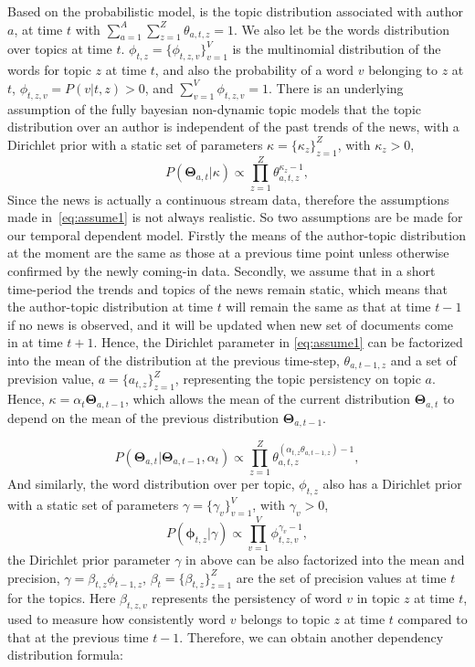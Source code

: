 Based on the probabilistic model, \thetadef is the topic distribution associated with author $a$, at time $t$ with  $\sum_{a=1}^A\sum_{z=1}^Z\theta_{a, t, z}=1$. We also let \phidef be the words distribution over topics at time $t$. $\phi_{t, z}=\{\phi_{t, z, v}\}_{v=1}^V$ is the multinomial distribution of the words for topic $z$ at time $t$, and also the probability of a word $v$ belonging to $z$ at $t$, $\phi_{t, z, v}=P(v|t, z)>0$, and $\sum_{v=1}^V \phi_{t, z, v}=1$. There is an underlying assumption of the fully bayesian non-dynamic topic models that the topic distribution over an author is independent of the past trends of the news, with a Dirichlet prior with a static set of parameters $\kappa=\{\kappa_z\}_{z=1}^Z$, with $\kappa_{z}>0$,
\begin{equation}
\label{eq:assume1}
P(\boldsymbol{\Theta}_{a,t} | \kappa)  \propto \prod_{z=1}^Z \theta_{a, t, z}^{\kappa_z -1},
\end{equation}
Since the news is actually a continuous stream data, therefore the assumptions made in~\eqref{eq:assume1} is not always realistic. So two assumptions are be made for our temporal dependent model. Firstly the means of the author-topic distribution at the moment are the same as those at a previous time point unless otherwise confirmed by the newly coming-in data. Secondly, we assume that in a short time-period the trends and topics of the news remain static, which means that the author-topic distribution at time $t$ will remain the same as that at time $t-1$ if no news is observed, and it will be updated when new set of documents come in at time $t+1$. Hence, the Dirichlet parameter in \eqref{eq:assume1} can be factorized into the mean of the distribution at the previous time-step, $\theta_{a,t-1,z}$ and a set of prevision value, $a = \{a_{t,z}\}_{z=1}^Z$, representing the topic persistency on topic $a$. Hence, $\kappa=\alpha_t \boldsymbol{\Theta}_{a,t-1}$, which allows the mean of the current distribution $\boldsymbol{\Theta}_{a,t}$ to depend on the mean of the previous distribution $\boldsymbol{\Theta}_{a,t-1}$.

\begin{equation}
\label{eq:shortTheta}
P(\boldsymbol{\Theta}_{a,t} | \boldsymbol{\Theta}_{a,t-1}, \alpha_t) \propto \prod_{z=1}^Z \theta_{a,t, z}^{(\alpha_{t, z} \theta_{a,t-1, z}) -1},
\end{equation}
And similarly, the word distribution over per topic, $\phi_{t, z}$ also has a Dirichlet prior with a static set of parameters $\gamma=\{\gamma_v\}_{v=1}^V$, with $\gamma_v>0$, 
\begin{equation}
\label{eq:assume2}
P(\boldsymbol{\phi}_{t, z} | \gamma) \propto \prod_{v=1}^V \phi_{t, z, v}^{\gamma_v -1},
\end{equation}
the Dirichlet prior parameter $\gamma$ in above can be also factorized into the mean and precision, $\gamma=\beta_{t, z} \phi_{t-1, z}$,  $\beta_t=\{\beta_{t, z}\}_{z=1}^Z$ are the set of precision values at time $t$ for the topics. Here $\beta_{t, z, v}$ represents the persistency of word $v$ in topic $z$ at time $t$, used to measure how consistently word $v$ belongs to topic $z$ at time $t$ compared to that at the previous time $t-1$. Therefore, we can obtain another dependency distribution formula:

